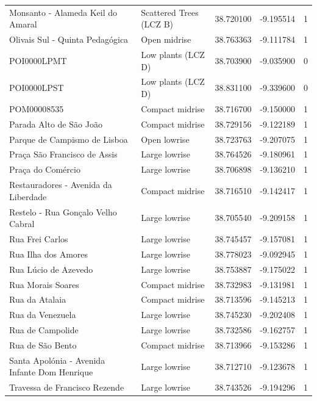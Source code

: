 \begin{tabular}{llrrr}
Monsanto - Alameda Keil do Amaral & Scattered Trees (LCZ B) & 38.720100 & -9.195514 & 1 \\
Olivais Sul - Quinta Pedagógica & Open midrise & 38.763363 & -9.111784 & 1 \\
POI0000LPMT & Low plants (LCZ D) & 38.703900 & -9.035900 & 0 \\
POI0000LPST & Low plants (LCZ D) & 38.831100 & -9.339600 & 0 \\
POM00008535 & Compact midrise & 38.716700 & -9.150000 & 1 \\
Parada Alto de São João & Compact midrise & 38.729156 & -9.122189 & 1 \\
Parque de Campismo de Lisboa & Open lowrise & 38.723763 & -9.207075 & 1 \\
Praça São Francisco de Assis & Large lowrise & 38.764526 & -9.180961 & 1 \\
Praça do Comércio & Large lowrise & 38.706898 & -9.136210 & 1 \\
Restauradores - Avenida da Liberdade & Compact midrise & 38.716510 & -9.142417 & 1 \\
Restelo - Rua Gonçalo Velho Cabral & Large lowrise & 38.705540 & -9.209158 & 1 \\
Rua Frei Carlos & Large lowrise & 38.745457 & -9.157081 & 1 \\
Rua Ilha dos Amores & Large lowrise & 38.778023 & -9.092945 & 1 \\
Rua Lúcio de Azevedo & Large lowrise & 38.753887 & -9.175022 & 1 \\
Rua Morais Soares & Compact midrise & 38.732983 & -9.131981 & 1 \\
Rua da Atalaia & Compact midrise & 38.713596 & -9.145213 & 1 \\
Rua da Venezuela & Large lowrise & 38.745230 & -9.202408 & 1 \\
Rua de Campolide & Large lowrise & 38.732586 & -9.162757 & 1 \\
Rua de São Bento & Compact midrise & 38.713966 & -9.153286 & 1 \\
Santa Apolónia - Avenida Infante Dom Henrique & Large lowrise & 38.712710 & -9.123678 & 1 \\
Travessa de Francisco Rezende & Large lowrise & 38.743526 & -9.194296 & 1 \\
\bottomrule
\end{tabular}
